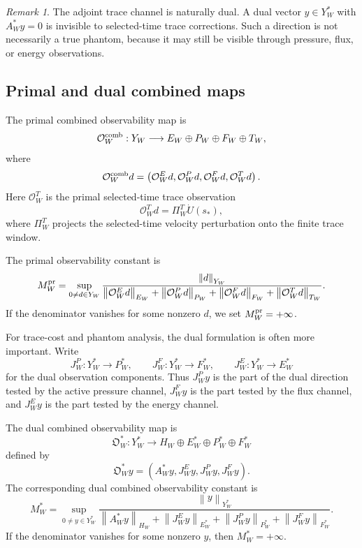 \documentclass[11pt]{article}
\numberwithin{equation}{section}
\theoremstyle{plain}
\theoremstyle{definition}
\theoremstyle{remark}
\newtheorem{remark}[theorem]{Remark}
\newcommand{\norm}[2]{\left\|#1\right\|_{#2}}
\newcommand{\calO}{\mathcal O}
\newcommand{\frakO}{\mathfrak O}
\begin{document}
\begin{remark}
The adjoint trace channel is naturally dual.  A dual vector \(y\in Y_W^*\) with \(A_W^*y=0\) is invisible to selected-time trace corrections.  Such a direction is not necessarily a true phantom, because it may still be visible through pressure, flux, or energy observations.
\end{remark}

\subsection{Primal and dual combined maps}

The primal combined observability map is
\[
  \calO_W^{\rm comb}:Y_W
  \longrightarrow
  E_W\oplus P_W\oplus F_W\oplus T_W,
\]
where
\begin{equation}
  \calO_W^{\rm comb}d
  =
  \left(
    \calO_W^E d,
    \calO_W^P d,
    \calO_W^F d,
    \calO_W^T d
  \right).
  \label{eq:primal-combined-map}
\end{equation}
Here \(\calO_W^T\) is the primal selected-time trace observation
\[
  \calO_W^T d=\Pi_W^T\dot U(s_*),
\]
where \(\Pi_W^T\) projects the selected-time velocity perturbation onto the finite trace window.

The primal observability constant is
\[
  M_W^{\rm pr}
  =
  \sup_{0\ne d\in Y_W}
  \frac{\norm{d}{Y_W}}
  {
  \norm{\calO_W^Ed}{E_W}
  +\norm{\calO_W^Pd}{P_W}
  +\norm{\calO_W^Fd}{F_W}
  +\norm{\calO_W^Td}{T_W}
  }.
\]
If the denominator vanishes for some nonzero \(d\), we set \(M_W^{\rm pr}=+\infty\).

For trace-cost and phantom analysis, the dual formulation is often more important.  Write
\[
  J_W^P:Y_W^*\to P_W^*,
  \qquad
  J_W^F:Y_W^*\to F_W^*,
  \qquad
  J_W^E:Y_W^*\to E_W^*
\]
for the dual observation components.  Thus \(J_W^Py\) is the part of the dual direction tested by the active pressure channel, \(J_W^Fy\) is the part tested by the flux channel, and \(J_W^Ey\) is the part tested by the energy channel.

The dual combined observability map is
\begin{equation}
  \frakO_W^*:Y_W^*
  \longrightarrow
  H_W\oplus E_W^*\oplus P_W^*\oplus F_W^*
  \label{eq:dual-combined-map}
\end{equation}
defined by
\begin{equation}
  \frakO_W^*y
  =
  \left(
    A_W^*y,
    J_W^Ey,
    J_W^Py,
    J_W^Fy
  \right).
  \label{eq:dual-map-components}
\end{equation}
The corresponding dual combined observability constant is
\[
  M_W^*
  =
  \sup_{0\ne y\in Y_W^*}
  \frac{\norm{y}{Y_W^*}}
  {
  \norm{A_W^*y}{H_W}
  +\norm{J_W^Ey}{E_W^*}
  +\norm{J_W^Py}{P_W^*}
  +\norm{J_W^Fy}{F_W^*}
  }.
\]
If the denominator vanishes for some nonzero \(y\), then \(M_W^*=+\infty\).
\end{document}
